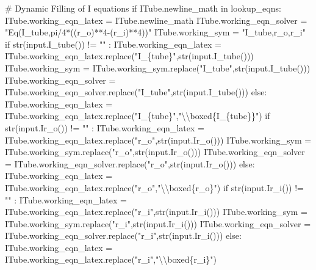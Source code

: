 \documentclass[
  letterpaper,
  DIV=11,
  numbers=noendperiod]{scrreprt}
\newenvironment{Shaded}{\begin{snugshade}}{\end{snugshade}}
\newcommand{\NormalTok}[1]{\textcolor[rgb]{0.00,0.23,0.31}{#1}}
\begin{document}
\begin{Shaded}
\begin{Highlighting}[]
\NormalTok{        \# Dynamic Filling of I equations }
\NormalTok{        if ITube.newline\_math in lookup\_eqns:}
\NormalTok{            ITube.working\_eqn\_latex = ITube.newline\_math}
\NormalTok{            ITube.working\_eqn\_solver = "Eq(I\_tube,pi/4*((r\_o)**4{-}(r\_i)**4))"}
\NormalTok{            ITube.working\_sym = "I\_tube,r\_o,r\_i"}
\NormalTok{            if str(input.I\_tube()) != "" : }
\NormalTok{                ITube.working\_eqn\_latex = ITube.working\_eqn\_latex.replace("I\_\{tube\}",str(input.I\_tube()))}
\NormalTok{                ITube.working\_sym = ITube.working\_sym.replace("I\_tube",str(input.I\_tube()))}
\NormalTok{                ITube.working\_eqn\_solver = ITube.working\_eqn\_solver.replace("I\_tube",str(input.I\_tube()))}
\NormalTok{            else:}
\NormalTok{                ITube.working\_eqn\_latex = ITube.working\_eqn\_latex.replace("I\_\{tube\}","\textbackslash{}\textbackslash{}boxed\{I\_\{tube\}\}")}
\NormalTok{            if str(input.Ir\_o()) != "" : }
\NormalTok{                ITube.working\_eqn\_latex = ITube.working\_eqn\_latex.replace("r\_o",str(input.Ir\_o()))}
\NormalTok{                ITube.working\_sym = ITube.working\_sym.replace("r\_o",str(input.Ir\_o()))}
\NormalTok{                ITube.working\_eqn\_solver = ITube.working\_eqn\_solver.replace("r\_o",str(input.Ir\_o()))}
\NormalTok{            else:}
\NormalTok{                ITube.working\_eqn\_latex = ITube.working\_eqn\_latex.replace("r\_o","\textbackslash{}\textbackslash{}boxed\{r\_o\}")}
\NormalTok{            if str(input.Ir\_i()) != "" : }
\NormalTok{                ITube.working\_eqn\_latex = ITube.working\_eqn\_latex.replace("r\_i",str(input.Ir\_i()))        }
\NormalTok{                ITube.working\_sym = ITube.working\_sym.replace("r\_i",str(input.Ir\_i()))}
\NormalTok{                ITube.working\_eqn\_solver = ITube.working\_eqn\_solver.replace("r\_i",str(input.Ir\_i()))}
\NormalTok{            else:}
\NormalTok{                ITube.working\_eqn\_latex = ITube.working\_eqn\_latex.replace("r\_i","\textbackslash{}\textbackslash{}boxed\{r\_i\}")}
            

\end{Highlighting}
\end{Shaded}
\end{document}
